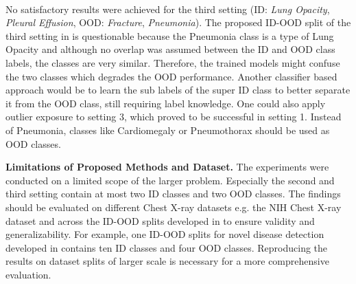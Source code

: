 \\
No satisfactory results were achieved for the third setting (ID: \textit{Lung Opacity}, \textit{Pleural Effusion}, OOD: \textit{Fracture}, \textit{Pneumonia}).
The proposed ID-OOD split of the third setting in \citep{Berger2021} is questionable because the Pneumonia class is a type of Lung Opacity \citep{Hansell2008} and although no overlap was assumed between the ID and OOD class labels, the classes are very similar. 
Therefore, the trained models might confuse the two classes which degrades the OOD performance. 
Another classifier based approach would be to learn the sub labels of the super ID class to better separate it from the OOD class, still requiring label knowledge.
One could also apply outlier exposure to setting 3, which proved to be successful in setting 1.
Instead of Pneumonia, classes like Cardiomegaly or Pneumothorax should be used as OOD classes.
\par
\textbf{Limitations of Proposed Methods and Dataset.}
The experiments were conducted on a limited scope of the larger problem.
Especially the second and third setting contain at most two ID classes and two OOD classes.
The findings should be evaluated on different Chest X-ray datasets e.g. the NIH Chest X-ray dataset \citep{Wang2017} and across the ID-OOD splits developed in \citep{Cao2020} to ensure validity and generalizability.
For example, one ID-OOD splits for novel disease detection developed in \citep{Cao2020} contains ten ID classes and four OOD classes.
Reproducing the results on dataset splits of larger scale is necessary for a more comprehensive evaluation.
